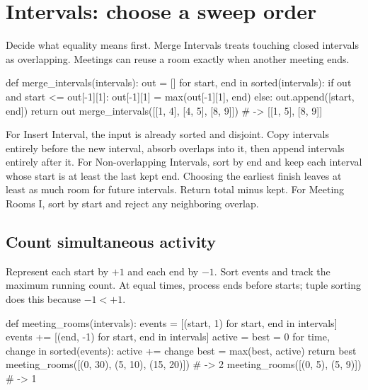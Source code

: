 \documentclass[11pt]{article}
\begin{document}
\section{Intervals: choose a sweep order}\label{sec:interval}
Decide what equality means first. Merge Intervals treats touching closed intervals as overlapping.
Meetings can reuse a room exactly when another meeting ends.

\par\noindent\begin{minipage}{\linewidth}
\hypertarget{example-start-63}{}
\begin{pyex}
def merge_intervals(intervals):
    out = []
    for start, end in sorted(intervals):
        if out and start <= out[-1][1]:
            out[-1][1] = max(out[-1][1], end)
        else:
            out.append([start, end])
    return out
merge_intervals([[1, 4], [4, 5], [8, 9]]) # -> [[1, 5], [8, 9]]
\end{pyex}
\hypertarget{example-end-63}{}
\end{minipage}\par
For Insert Interval, the input is already sorted and disjoint.
Copy intervals entirely before the new interval, absorb overlaps into it, then append intervals entirely after it.
For Non-overlapping Intervals, sort by end and keep each interval whose start is at least the last kept end.
Choosing the earliest finish leaves at least as much room for future intervals. Return total minus kept.
For Meeting Rooms I, sort by start and reject any neighboring overlap.

\subsection{Count simultaneous activity}
Represent each start by \(+1\) and each end by \(-1\). Sort events and track the maximum running count.
At equal times, process ends before starts; tuple sorting does this because \(-1 < +1\).
\par\noindent\begin{minipage}{\linewidth}
\hypertarget{example-start-64}{}
\begin{pyex}
def meeting_rooms(intervals):
    events = [(start, 1) for start, end in intervals]
    events += [(end, -1) for start, end in intervals]
    active = best = 0
    for time, change in sorted(events):
        active += change
        best = max(best, active)
    return best
meeting_rooms([(0, 30), (5, 10), (15, 20)]) # -> 2
meeting_rooms([(0, 5), (5, 9)])       # -> 1
\end{pyex}
\hypertarget{example-end-64}{}
\end{minipage}\par
\end{document}
